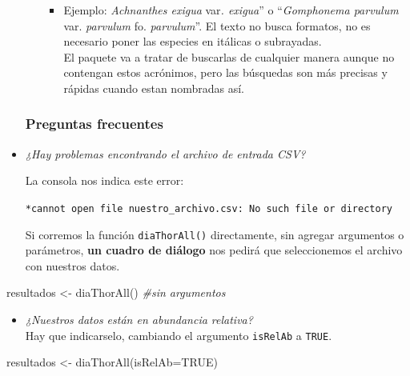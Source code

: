 \documentclass[
]{book}
\newenvironment{Shaded}{\begin{snugshade}}{\end{snugshade}}
\newcommand{\AttributeTok}[1]{\textcolor[rgb]{0.77,0.63,0.00}{#1}}
\newcommand{\CommentTok}[1]{\textcolor[rgb]{0.56,0.35,0.01}{\textit{#1}}}
\newcommand{\ConstantTok}[1]{\textcolor[rgb]{0.00,0.00,0.00}{#1}}
\newcommand{\FunctionTok}[1]{\textcolor[rgb]{0.00,0.00,0.00}{#1}}
\newcommand{\NormalTok}[1]{#1}
\newcommand{\OtherTok}[1]{\textcolor[rgb]{0.56,0.35,0.01}{#1}}
\providecommand{\tightlist}{%
  \setlength{\itemsep}{0pt}\setlength{\parskip}{0pt}}
\begin{document}
\begin{itemize}
\begin{itemize}
    \begin{itemize}
    \tightlist
    \item
      Ejemplo: \emph{Achnanthes exigua} var\emph{. exigua}'' o ``\emph{Gomphonema parvulum} var. \emph{parvulum} fo. \emph{parvulum}''. El texto no busca formatos, no es necesario poner las especies en itálicas o subrayadas.\\
      El paquete va a tratar de buscarlas de cualquier manera aunque no contengan estos acrónimos, pero las búsquedas son más precisas y rápidas cuando estan nombradas así.
    \end{itemize}
  \end{itemize}

  \hypertarget{preguntas-frecuentes}{%
  \subsubsection{Preguntas frecuentes}\label{preguntas-frecuentes}}
\item
  \emph{¿Hay problemas encontrando el archivo de entrada CSV?}

  La consola nos indica este error:

  \texttt{*cannot\ open\ file\ \textquotesingle{}nuestro\_archivo.csv\textquotesingle{}:\ No\ such\ file\ or\ directory}

  Si corremos la función \texttt{diaThorAll()} directamente, sin agregar argumentos o parámetros, \textbf{un cuadro de diálogo} nos pedirá que seleccionemos el archivo con nuestros datos.
\end{itemize}

\begin{Shaded}
\begin{Highlighting}[]
\NormalTok{resultados }\OtherTok{\textless{}{-}} \FunctionTok{diaThorAll}\NormalTok{() }\CommentTok{\#sin argumentos}
\end{Highlighting}
\end{Shaded}

\begin{itemize}
\tightlist
\item
  \emph{¿Nuestros datos están en abundancia relativa?}\\
  Hay que indicarselo, cambiando el argumento \texttt{isRelAb} a \texttt{TRUE}.
\end{itemize}

\begin{Shaded}
\begin{Highlighting}[]
\NormalTok{resultados }\OtherTok{\textless{}{-}} \FunctionTok{diaThorAll}\NormalTok{(}\AttributeTok{isRelAb=}\ConstantTok{TRUE}\NormalTok{)}
\end{Highlighting}
\end{Shaded}
\end{document}
